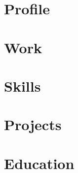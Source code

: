 \documentclass[11pt,a4paper]{moderncv}
\begin{document}
\section*{Profile}

\section*{Work}

\section*{Skills}

\section*{Projects}

\section*{Education}
\end{document}
